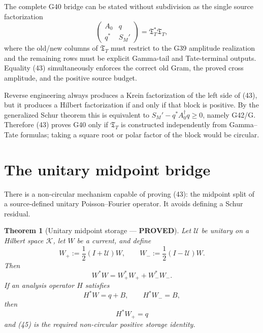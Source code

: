 \documentclass[11pt]{article}
\newtheorem{theorem}{Theorem}
\newcommand{\PROVED}{\textcolor{green!45!black}{\textbf{PROVED}}}
\begin{document}
The complete G40 bridge can be stated without subdivision as the single
source factorization
\begin{equation}
 \boxed{
 \begin{pmatrix}A_0&q\\q^*&S_M'\end{pmatrix}
 =\mathfrak T_T^*\mathfrak T_T,}                        \tag{43}
\end{equation}
where the old/new columns of $\mathfrak T_T$ must restrict to the G39
amplitude realization and the remaining rows must be explicit Gamma-tail and
Tate-terminal outputs.  Equality (43) simultaneously enforces the correct old
Gram, the proved cross amplitude, and the positive source budget.

Reverse engineering always produces a Krein factorization of the left side of
(43), but it produces a Hilbert factorization if and only if that block is
positive.  By the generalized Schur theorem this is equivalent to
$S_M'-q^*A_0^\dagger q\ge0$, namely G42/G.  Therefore (43) proves G40 only if
$\mathfrak T_T$ is constructed independently from Gamma--Tate formulas; taking
a square root or polar factor of the block would be circular.

\section{The unitary midpoint bridge}

There is a non-circular mechanism capable of proving (43): the midpoint split
of a source-defined unitary Poisson--Fourier operator.  It avoids defining a
Schur residual.

\begin{theorem}[Unitary midpoint storage --- \PROVED]
Let $\mathcal U$ be unitary on a Hilbert space $\mathcal K$, let $W$ be a
current, and define
\begin{equation}
 W_+:=\frac12(I+\mathcal U)W,
 \qquad
 W_-:=\frac12(I-\mathcal U)W.                           \tag{44}
\end{equation}
Then
\begin{equation}
 W^*W=W_+^*W_++W_-^*W_-.                               \tag{45}
\end{equation}
If an analysis operator $H$ satisfies
\begin{equation}
 H^*W=q+B,\qquad H^*W_-=B,                             \tag{46}
\end{equation}
then
\begin{equation}
 H^*W_+=q                                               \tag{47}
\end{equation}
and (45) is the required non-circular positive storage identity.
\end{theorem}
\end{document}
